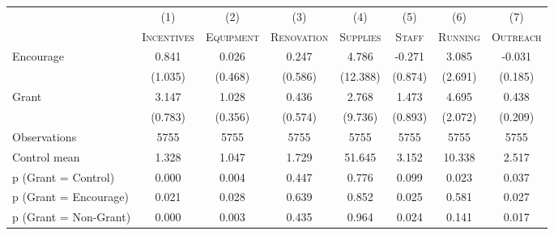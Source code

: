 \begin{tabular*}{\hsize}{@{\hskip\tabcolsep\extracolsep\fill}l*{7}{c}}
\toprule
                    &\multicolumn{1}{c}{(1)}&\multicolumn{1}{c}{(2)}&\multicolumn{1}{c}{(3)}&\multicolumn{1}{c}{(4)}&\multicolumn{1}{c}{(5)}&\multicolumn{1}{c}{(6)}&\multicolumn{1}{c}{(7)}\\
                    &\multicolumn{1}{c}{\textsc{Incentives}}&\multicolumn{1}{c}{\textsc{Equipment}}&\multicolumn{1}{c}{\textsc{Renovation}}&\multicolumn{1}{c}{\textsc{Supplies}}&\multicolumn{1}{c}{\textsc{Staff}}&\multicolumn{1}{c}{\textsc{Running}}&\multicolumn{1}{c}{\textsc{Outreach}}\\
\midrule
Encourage           &       0.841&       0.026&       0.247&       4.786&      -0.271&       3.085&      -0.031\\
                    &     (1.035)&     (0.468)&     (0.586)&    (12.388)&     (0.874)&     (2.691)&     (0.185)\\
\addlinespace
Grant               &       3.147&       1.028&       0.436&       2.768&       1.473&       4.695&       0.438\\
                    &     (0.783)&     (0.356)&     (0.574)&     (9.736)&     (0.893)&     (2.072)&     (0.209)\\
\midrule
Observations        &        5755&        5755&        5755&        5755&        5755&        5755&        5755\\
Control mean        &       1.328&       1.047&       1.729&      51.645&       3.152&      10.338&       2.517\\
p (Grant = Control) &       0.000&       0.004&       0.447&       0.776&       0.099&       0.023&       0.037\\
p (Grant = Encourage)&       0.021&       0.028&       0.639&       0.852&       0.025&       0.581&       0.027\\
p (Grant = Non-Grant)&       0.000&       0.003&       0.435&       0.964&       0.024&       0.141&       0.017\\
\bottomrule
\end{tabular*}
